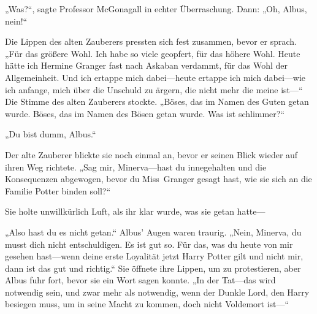 „Was?“, sagte Professor McGonagall in echter Überraschung. Dann: „Oh, Albus, nein!“

Die Lippen des alten Zauberers pressten sich fest zusammen, bevor er sprach.
„Für das größere Wohl. Ich habe so viele geopfert, für das höhere Wohl. Heute hätte ich Hermine Granger fast nach Askaban verdammt, für das Wohl der Allgemeinheit. Und ich ertappe mich dabei—heute ertappe ich mich dabei—wie ich anfange, mich über die Unschuld zu ärgern, die nicht mehr die meine ist—“
Die Stimme des alten Zauberers stockte.
„Böses, das im Namen des Guten getan wurde. Böses, das im Namen des Bösen getan wurde. Was ist schlimmer?“

„Du bist dumm, Albus.“

Der alte Zauberer blickte sie noch einmal an, bevor er seinen Blick wieder auf ihren Weg richtete. „Sag mir, Minerva—hast du innegehalten und die Konsequenzen abgewogen, bevor du Miss~Granger gesagt hast, wie sie sich an die Familie Potter binden soll?“

Sie holte unwillkürlich Luft, als ihr klar wurde, was sie getan hatte—

„Also hast du es nicht getan.“ Albus’ Augen waren traurig. „Nein, Minerva, du musst dich nicht entschuldigen. Es ist gut so. Für das, was du heute von mir gesehen hast—wenn deine erste Loyalität jetzt Harry Potter gilt und nicht mir, dann ist das gut und richtig.“
Sie öffnete ihre Lippen, um zu protestieren, aber Albus fuhr fort, bevor sie ein Wort sagen konnte. „In der Tat—das wird notwendig sein, und zwar mehr als notwendig, wenn der Dunkle Lord, den Harry besiegen muss, um in seine Macht zu kommen, doch nicht Voldemort ist—“

